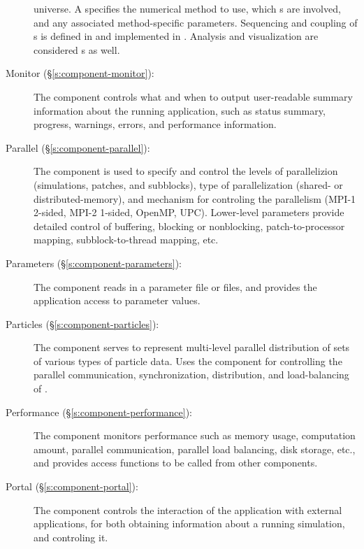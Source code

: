 \begin{description}
        universe.  A  specifies the numerical method to
        use, which s are involved, and any associated
        method-specific parameters.  Sequencing and coupling of
        s is defined in  and implemented in
        .  Analysis and visualization are considered
        s as well.
%
 \item [\todo Monitor (\S\ref{s:component-monitor}): ]
%
        The  component controls what and when to output
        user-readable summary information about the running
        application, such as status summary, progress, warnings,
        errors, and performance information.
%
 \item [\todo Parallel (\S\ref{s:component-parallel}): ]
%
        The  component is used to specify and control
        the levels of parallelizion (simulations, patches, and
        subblocks), type of parallelization (shared- or
        distributed-memory), and mechanism for controling the
        parallelism (MPI-1 2-sided, MPI-2 1-sided, OpenMP, UPC).
        Lower-level parameters provide detailed control of buffering,
        blocking or nonblocking, patch-to-processor mapping,
        subblock-to-thread mapping, etc.
%
 \item [\todo Parameters (\S\ref{s:component-parameters}): ]
%
        The  component
        reads in a parameter file or files, and provides the
        application access to parameter values.
%
 \item [\todo Particles (\S\ref{s:component-particles}): ]
%
        The  component serves to represent multi-level
        parallel distribution of sets of various types of particle
        data.  Uses the  component for controlling the
        parallel communication, synchronization, distribution, and
        load-balancing of .
%
 \item [\todo Performance (\S\ref{s:component-performance}): ]
%
        The  component monitors performance such as
        memory usage, computation amount, parallel communication,
        parallel load balancing, disk storage, etc., and provides
        access functions to be called from other components.
%
 \item [\todo Portal (\S\ref{s:component-portal}): ]
%
        The  component controls the interaction of the
        application with external applications, for both obtaining
        information about a running simulation, and controling it.

\end{description}
